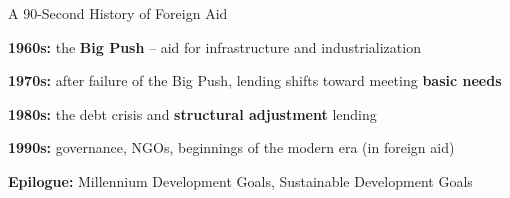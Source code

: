 \documentclass[10pt,xcolor=table,ignorenonframetext,handout,aspectratio=169]{beamer}
\begin{document}
%	
%	
%	
%	
%
%
%
%
%
%	
%	
%	
%	
%
%
%
%
%
%	
%	
%	
%	
%




\begin{frame}{A 90-Second History of Foreign Aid}


\medskip
\textbf{1960s:}  the \textbf{Big Push} -- aid for infrastructure and industrialization

\medskip
\medskip
\textbf{1970s:}  after failure of the Big Push, lending shifts toward meeting \textbf{basic needs} 

\medskip
\medskip
\textbf{1980s:}  the debt crisis and \textbf{structural adjustment} lending 

\medskip
\medskip
\textbf{1990s:}  governance, NGOs, beginnings of the modern era (in foreign aid)

\medskip
\medskip
\textbf{Epilogue:}  Millennium Development Goals, Sustainable Development Goals


\end{frame}
\end{document}
